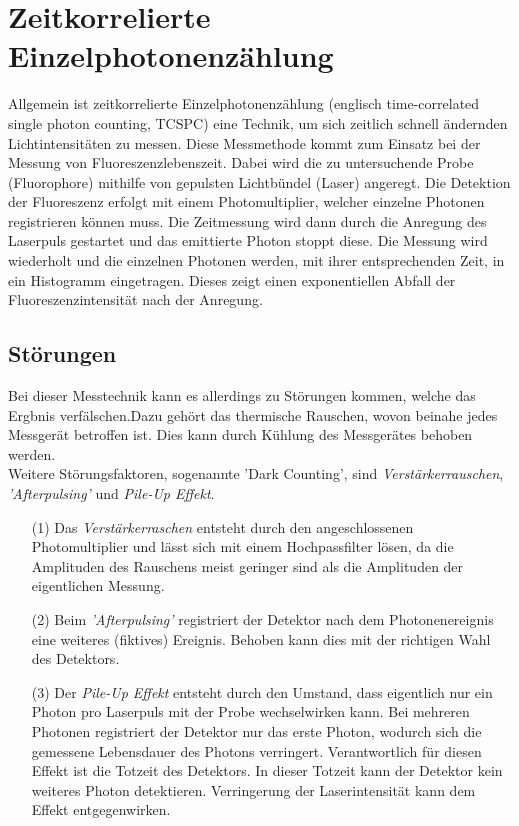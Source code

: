 \section{Zeitkorrelierte Einzelphotonenzählung}
Allgemein ist zeitkorrelierte Einzelphotonenzählung (englisch time-correlated single photon counting, TCSPC) eine Technik, um sich zeitlich schnell ändernden Lichtintensitäten zu messen. Diese Messmethode kommt zum Einsatz bei der Messung von Fluoreszenzlebenszeit. Dabei wird die zu untersuchende Probe (Fluorophore) mithilfe von gepulsten Lichtbündel (Laser) angeregt. Die Detektion der Fluoreszenz erfolgt mit einem Photomultiplier, welcher einzelne Photonen registrieren können muss. Die Zeitmessung wird dann durch die Anregung des Laserpuls gestartet und das emittierte Photon stoppt diese. Die Messung wird wiederholt und die einzelnen Photonen werden, mit ihrer entsprechenden Zeit, in ein Histogramm eingetragen. Dieses zeigt einen exponentiellen Abfall der Fluoreszenzintensität nach der Anregung. 
\subsection*{Störungen}
Bei dieser Messtechnik kann es allerdings zu Störungen kommen, welche das Ergbnis verfälschen.Dazu gehört das thermische Rauschen, wovon beinahe jedes Messgerät betroffen ist. Dies kann durch Kühlung des Messgerätes behoben werden.\\Weitere Störungsfaktoren, sogenannte ’Dark Counting’, sind \textit{Verstärkerrauschen}, \textit{'Afterpulsing'} und \textit{Pile-Up Effekt}.
\begin{itemize}
    \item[(1)] Das \textit{Verstärkerraschen} entsteht durch den angeschlossenen Photomultiplier und lässt sich mit einem Hochpassfilter lösen, da die Amplituden des Rauschens meist geringer sind als die Amplituden der eigentlichen Messung.
    \item[(2)] Beim \textit{'Afterpulsing'} registriert der Detektor nach dem Photonenereignis eine weiteres (fiktives) Ereignis. Behoben kann dies mit der richtigen Wahl des Detektors.
    \item[(3)] Der \textit{Pile-Up Effekt} entsteht durch den Umstand, dass eigentlich nur ein Photon pro Laserpuls mit der Probe wechselwirken kann. Bei mehreren Photonen registriert der Detektor nur das erste Photon, wodurch sich die gemessene Lebensdauer des Photons verringert. Verantwortlich für diesen Effekt ist die Totzeit des Detektors. In dieser Totzeit kann der Detektor kein weiteres Photon detektieren. Verringerung der Laserintensität kann dem Effekt entgegenwirken. \citep{Time}
\end{itemize} 
\newpage
